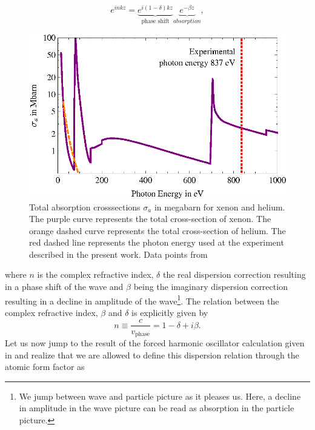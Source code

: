 \begin{equation}
e^{i n k z}= \underbrace{e^{i \left(1-\delta\right)k z}}_{\text{phase shift}}\underbrace{e^{-\beta z}}_{absorption},
\label{eq:wave-in-medium}
\end{equation}
\begin{figure}
	\centering
		\includegraphics[width=1.00\textwidth]{images/photoionization.eps}
	\caption[Total absorption cross-sections for helium and xenon.]{Total absorption crosssections $\sigma_{a}$ in megabarn for xenon and helium. The purple curve represents the total cross-section of xenon. The orange dashed curve represents the total cross-section of helium. The red dashed line represents the photon energy used at the experiment described in the present work. Data points from \citep{Elettra-2016-Website,Yeh-1985-AtmDat,Yeh-1993-GBSP}}
	\label{fig:photoionization}
\end{figure}
where $n$ is the complex refractive index, $\delta$ the real dispersion correction resulting in a phase shift of the wave and $\beta$ being the imaginary dispersion correction resulting in a decline in amplitude of the wave\footnote{We jump between wave and particle picture as it pleases us. Here, a decline in amplitude in the wave picture can be read as absorption in the particle picture.}. The relation between the complex refractive index, $\beta$ and $\delta$ is explicitly given by
\begin{equation}
n\equiv \frac{c}{v_{\text{phase}}}=1-\delta+i\beta.
\label{eq:complex-refractive-index}
\end{equation}
Let us now jump to the result of the forced harmonic oscillator calculation given in \citep[p.~278]{Als-Nielson-2011-JWS} and realize that we are allowed to define this dispersion relation through the atomic form factor as \citep[see][p.~76]{Als-Nielson-2011-JWS}

